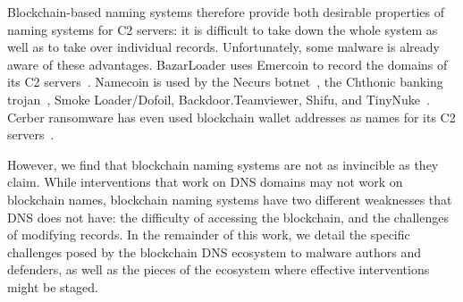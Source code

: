 Blockchain-based naming systems therefore provide both desirable properties of 
naming systems for C2 servers: it is difficult to take down the whole system as 
well as to take over individual records. Unfortunately, some malware is already 
aware of these advantages. BazarLoader uses Emercoin 
to record the domains of its C2 servers~\cite{brandt_bazarloader_2021}. 
Namecoin is used by the Necurs botnet~\cite{dgas_of_necurs}, the 
Chthonic banking trojan~\cite{malware_traffic_analysis_2016}, Smoke 
Loader/Dofoil, Backdoor.Teamviewer, Shifu, and TinyNuke~\cite{abusech_2017, 
mackie_cryptodns_2018}. Cerber ransomware has 
even used blockchain wallet addresses as names for its C2 
servers~\cite{pletinckx_malware_2018}.

However, we find that blockchain naming systems are not as invincible as they 
claim. While interventions that work on DNS domains may not work on blockchain 
names, blockchain naming systems have two different 
weaknesses that DNS does not have: the difficulty of accessing the blockchain,  
and the challenges of modifying records. In the remainder of this work, we 
detail the specific challenges posed by the blockchain DNS ecosystem to malware 
authors and defenders, as well as the pieces of the ecosystem where 
effective interventions might be staged.

%

